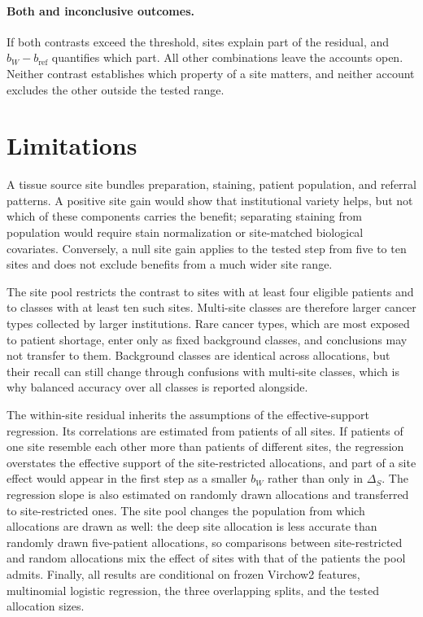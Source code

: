 \documentclass[11pt]{article}
\begin{document}
\paragraph{Both and inconclusive outcomes.}
If both contrasts exceed the threshold, sites explain part of the residual, and $b_W-b_{\mathrm{ref}}$ quantifies which part. All other combinations leave the accounts open. Neither contrast establishes which property of a site matters, and neither account excludes the other outside the tested range.



\section{Limitations}
\label{sec:limitations}
A tissue source site bundles preparation, staining, patient population, and referral patterns. A positive site gain would show that institutional variety helps, but not which of these components carries the benefit; separating staining from population would require stain normalization or site-matched biological covariates. Conversely, a null site gain applies to the tested step from five to ten sites and does not exclude benefits from a much wider site range.

The site pool restricts the contrast to sites with at least four eligible patients and to classes with at least ten such sites. Multi-site classes are therefore larger cancer types collected by larger institutions. Rare cancer types, which are most exposed to patient shortage, enter only as fixed background classes, and conclusions may not transfer to them. Background classes are identical across allocations, but their recall can still change through confusions with multi-site classes, which is why balanced accuracy over all classes is reported alongside.

The within-site residual inherits the assumptions of the effective-support regression. Its correlations are estimated from patients of all sites. If patients of one site resemble each other more than patients of different sites, the regression overstates the effective support of the site-restricted allocations, and part of a site effect would appear in the first step as a smaller $b_W$ rather than only in $\Delta_S$. The regression slope is also estimated on randomly drawn allocations and transferred to site-restricted ones. The site pool changes the population from which allocations are drawn as well: the deep site allocation is less accurate than randomly drawn five-patient allocations, so comparisons between site-restricted and random allocations mix the effect of sites with that of the patients the pool admits. Finally, all results are conditional on frozen Virchow2 features, multinomial logistic regression, the three overlapping splits, and the tested allocation sizes.



\end{document}
